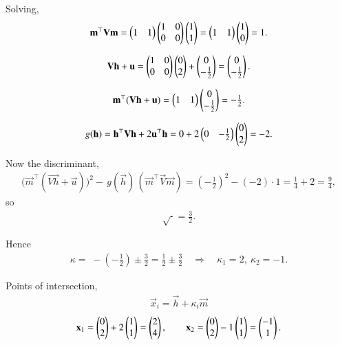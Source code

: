 \documentclass[journal]{IEEEtran}
\begin{document}
Solving,
\begin{align}
\mathbf{m}^{\top}\mathbf{V}\mathbf{m}
=\begin{pmatrix}1 & 1\end{pmatrix}\begin{pmatrix}1 & 0\\0 & 0\end{pmatrix}\begin{pmatrix}1\\1\end{pmatrix}
=\begin{pmatrix}1 & 1\end{pmatrix}\begin{pmatrix}1\\0\end{pmatrix}=1.
\end{align}

\begin{align}
\mathbf{Vh}+\mathbf{u}
=\begin{pmatrix}1 & 0\\0 & 0\end{pmatrix}\begin{pmatrix}0\\2\end{pmatrix}
+\begin{pmatrix}0\\-\tfrac{1}{2}\end{pmatrix}
=\begin{pmatrix}0\\-\tfrac{1}{2}\end{pmatrix}.
\end{align}

\begin{align}
\mathbf{m}^{\top}(\mathbf{Vh}+\mathbf{u})
=\begin{pmatrix}1 & 1\end{pmatrix}\begin{pmatrix}0\\-\tfrac{1}{2}\end{pmatrix}=-\tfrac{1}{2}.
\end{align}

\begin{align}
g(\mathbf{h})
=\mathbf{h}^{\top}\mathbf{V}\mathbf{h}+2\mathbf{u}^{\top}\mathbf{h}
=0+2\begin{pmatrix}0 & -\tfrac{1}{2}\end{pmatrix}\begin{pmatrix}0\\2\end{pmatrix}=-2.
\end{align}

Now the discriminant,
\begin{align}
\big(\vec{m}^{\top}(\vec{Vh}+\vec{u})\big)^{2}
-\,g(\vec{h})\,(\vec{m}^{\top}\vec{V}\vec{m})
=\left(-\tfrac{1}{2}\right)^{2}-(-2)\cdot 1
=\tfrac{1}{4}+2=\tfrac{9}{4},
\end{align}
so 
\begin{align}
\sqrt{\cdot}=\tfrac{3}{2}.
\end{align}

Hence
\begin{align}
\kappa=\; -(-\tfrac{1}{2})\pm \tfrac{3}{2}
=\tfrac{1}{2}\pm \tfrac{3}{2}\quad\Longrightarrow\quad
\kappa_{1}=2,\ \kappa_{2}=-1.
\end{align}

Points of intersection,
\begin{align}
\vec{x}_{i}=\vec{h}+\kappa_{i}\vec{m}
\end{align}
\begin{align}
\mathbf{x}_{1}=\begin{pmatrix}0\\2\end{pmatrix}+2\begin{pmatrix}1\\1\end{pmatrix}=\begin{pmatrix}2\\4\end{pmatrix},\qquad
\mathbf{x}_{2}=\begin{pmatrix}0\\2\end{pmatrix}-1\begin{pmatrix}1\\1\end{pmatrix}=\begin{pmatrix}-1\\1\end{pmatrix}.
\end{align}
\end{document}
